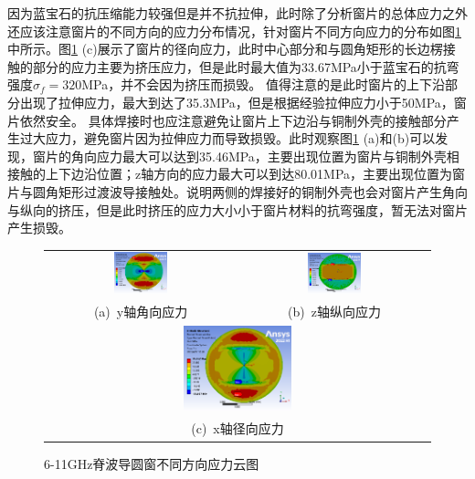 \documentclass[master]{thesis-uestc}
\begin{document}
因为蓝宝石的抗压缩能力较强但是并不抗拉伸，此时除了分析窗片的总体应力之外还应该注意窗片的不同方向的应力分布情况，针对窗片不同方向应力的分布如图\ref{fig:X输入不同方向应力分布} 中所示。图\ref{fig:X输入不同方向应力分布} (c)展示了窗片的径向应力，此时中心部分和与圆角矩形的长边楞接触的部分的应力主要为挤压应力，但是此时最大值为33.67MPa小于蓝宝石的抗弯强度\(\sigma_f=320\)MPa，并不会因为挤压而损毁。
值得注意的是此时窗片的上下沿部分出现了拉伸应力，最大到达了35.3MPa，但是根据经验拉伸应力小于50MPa，窗片依然安全。
具体焊接时也应注意避免让窗片上下边沿与铜制外壳的接触部分产生过大应力，避免窗片因为拉伸应力而导致损毁。此时观察图\ref{fig:X输入不同方向应力分布} (a)和(b)可以发现，窗片的角向应力最大可以达到35.46MPa，主要出现位置为窗片与铜制外壳相接触的上下边沿位置；z轴方向的应力最大可以到达80.01MPa，主要出现位置为窗片与圆角矩形过渡波导接触处。说明两侧的焊接好的铜制外壳也会对窗片产生角向与纵向的挤压，但是此时挤压的应力大小小于窗片材料的抗弯强度，暂无法对窗片产生损毁。
\begin{figure}[!htb]
    \small
    \centering
    \begin{tabular}{@{\ }c@{\ }c}
        \includegraphics[width=0.29\textwidth]{pic/chapter3/Xy轴角向应力.png} & 
        \hspace{5pt}
        \includegraphics[width=0.29\textwidth]{pic/chapter3/Xz轴纵向应力.png}     \\
        \mbox{\small (a) y轴角向应力}                                                                               & 
        \mbox{\small (b) z轴纵向应力}                                                           \\[6bp]
        \multicolumn{2}{c}{\includegraphics[width=0.29\textwidth]{pic/chapter3/Xx轴径向应力.png}} \\  %
        \multicolumn{2}{c}{\mbox{\small (c) x轴径向应力}}             
    \end{tabular}
    \caption{6-11GHz脊波导圆窗不同方向应力云图}
    \label{fig:X输入不同方向应力分布}
\end{figure}
\end{document}
